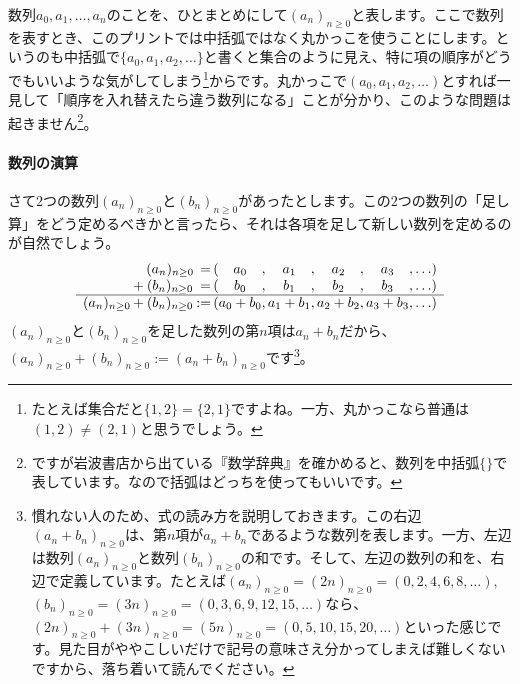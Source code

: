数列$a_0, a_1, \ldots, a_n$のことを、ひとまとめにして$(a_n)_{n\geq 0}$と表します。ここで数列を表すとき、このプリントでは中括弧ではなく丸かっこを使うことにします。というのも中括弧で$\{a_0, a_1, a_2, \ldots\}$と書くと集合のように見え、特に項の順序がどうでもいいような気がしてしまう\footnote{たとえば集合だと$\{1, 2\} = \{2, 1\}$ですよね。一方、丸かっこなら普通は$(1, 2) \neq (2,1)$と思うでしょう。}からです。丸かっこで$(a_0, a_1, a_2, \ldots)$とすれば一見して「順序を入れ替えたら違う数列になる」ことが分かり、このような問題は起きません\footnote{ですが岩波書店から出ている『数学辞典』を確かめると、数列を中括弧$\{\}$で表しています。なので括弧はどっちを使ってもいいです。}。

\paragraph{数列の演算} さて$2$つの数列$(a_n)_{n \geq 0}$と$(b_n)_{n \geq 0}$があったとします。この$2$つの数列の「足し算」をどう定めるべきかと言ったら、それは各項を足して新しい数列を定めるのが自然でしょう。
\begin{align*}
\begin{array}{c@{\,}c@{\,}c@{\,}r@{\,}c@{}c@{}c@{\,}c@{}c@{\,}c@{}c@{\,}c@{}c@{\,}l}
					&	& (a_n)_{n \geq 0} & =	& ( & a_0		& , & a_1		& , & a_2		& , & a_3		& , & \ldots) \\
					& +	& (b_n)_{n \geq 0} & =	& ( & b_0		& , & b_1		& , & b_2		& , & b_3		& , & \ldots) \\ \hline
(a_n)_{n \geq 0}	& +	& (b_n)_{n \geq 0} & :=	& ( & a_0 + b_0	& , & a_1 + b_1	& , & a_2 + b_2	& , & a_3 + b_3	& , & \ldots)
\end{array}
\end{align*}
$(a_n)_{n \geq 0}$と$(b_n)_{n \geq 0}$を足した数列の第$n$項は$a_n + b_n$だから、$(a_n)_{n \geq 0} + (b_n)_{n \geq 0} := (a_n + b_n)_{n \geq 0}$です\footnote{慣れない人のため、式の読み方を説明しておきます。この右辺$(a_n + b_n)_{n \geq 0}$は、第$n$項が$a_n + b_n$であるような数列を表します。一方、左辺は数列$(a_n)_{n \geq 0}$と数列$(b_n)_{n \geq 0}$の和です。そして、左辺の数列の和を、右辺で定義しています。たとえば$(a_n)_{n \geq 0} = (2n)_{n \geq 0} = (0, 2, 4, 6, 8, \ldots)$, $(b_n)_{n \geq 0} = (3n)_{n \geq 0} = (0, 3, 6, 9, 12, 15, \ldots)$なら、$(2n)_{n \geq 0} + (3n)_{n \geq 0} = (5n)_{n \geq 0} = (0, 5, 10, 15, 20, \ldots)$といった感じです。見た目がややこしいだけで記号の意味さえ分かってしまえば難しくないですから、落ち着いて読んでください。}。


